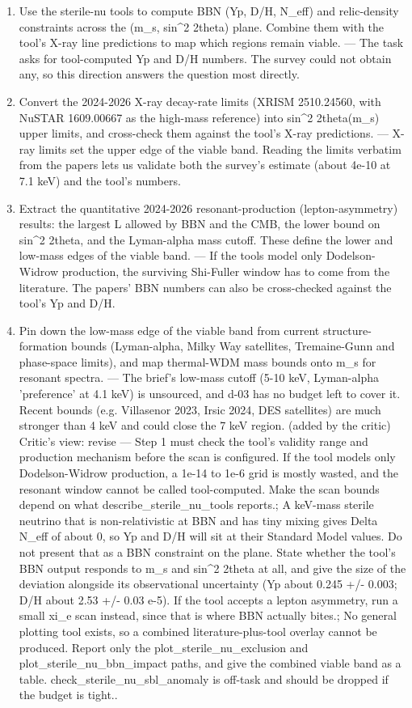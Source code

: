 \documentclass[11pt,a4paper]{article}
\begin{document}
\begin{enumerate}
  \item Use the sterile-nu tools to compute BBN (Yp, D/H, N\_eff) and relic-density constraints across the (m\_s, sin\textasciicircum{}2 2theta) plane. Combine them with the tool's X-ray line predictions to map which regions remain viable. --- The task asks for tool-computed Yp and D/H numbers. The survey could not obtain any, so this direction answers the question most directly.
  \item Convert the 2024-2026 X-ray decay-rate limits (XRISM 2510.24560, with NuSTAR 1609.00667 as the high-mass reference) into sin\textasciicircum{}2 2theta(m\_s) upper limits, and cross-check them against the tool's X-ray predictions. --- X-ray limits set the upper edge of the viable band. Reading the limits verbatim from the papers lets us validate both the survey's estimate (about 4e-10 at 7.1 keV) and the tool's numbers.
  \item Extract the quantitative 2024-2026 resonant-production (lepton-asymmetry) results: the largest L allowed by BBN and the CMB, the lower bound on sin\textasciicircum{}2 2theta, and the Lyman-alpha mass cutoff. These define the lower and low-mass edges of the viable band. --- If the tools model only Dodelson-Widrow production, the surviving Shi-Fuller window has to come from the literature. The papers' BBN numbers can also be cross-checked against the tool's Yp and D/H.
  \item Pin down the low-mass edge of the viable band from current structure-formation bounds (Lyman-alpha, Milky Way satellites, Tremaine-Gunn and phase-space limits), and map thermal-WDM mass bounds onto m\_s for resonant spectra. --- The brief's low-mass cutoff (5-10 keV, Lyman-alpha 'preference' at 4.1 keV) is unsourced, and d-03 has no budget left to cover it. Recent bounds (e.g. Villasenor 2023, Irsic 2024, DES satellites) are much stronger than 4 keV and could close the 7 keV region. (added by the critic)
Critic's view: revise --- Step 1 must check the tool's validity range and production mechanism before the scan is configured. If the tool models only Dodelson-Widrow production, a 1e-14 to 1e-6 grid is mostly wasted, and the resonant window cannot be called tool-computed. Make the scan bounds depend on what describe\_sterile\_nu\_tools reports.; A keV-mass sterile neutrino that is non-relativistic at BBN and has tiny mixing gives Delta N\_eff of about 0, so Yp and D/H will sit at their Standard Model values. Do not present that as a BBN constraint on the plane. State whether the tool's BBN output responds to m\_s and sin\textasciicircum{}2 2theta at all, and give the size of the deviation alongside its observational uncertainty (Yp about 0.245 +/- 0.003; D/H about 2.53 +/- 0.03 e-5). If the tool accepts a lepton asymmetry, run a small xi\_e scan instead, since that is where BBN actually bites.; No general plotting tool exists, so a combined literature-plus-tool overlay cannot be produced. Report only the plot\_sterile\_nu\_exclusion and plot\_sterile\_nu\_bbn\_impact paths, and give the combined viable band as a table. check\_sterile\_nu\_sbl\_anomaly is off-task and should be dropped if the budget is tight..

\end{enumerate}
\end{document}
